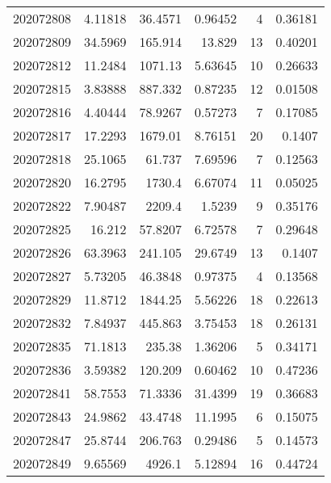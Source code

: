 \begin{tabular}{rrrrrr}
 202072808 &          4.11818 &       36.4571 &            0.96452 &           4 & 0.36181 \\
 202072809 &         34.5969  &      165.914  &           13.829   &          13 & 0.40201 \\
 202072812 &         11.2484  &     1071.13   &            5.63645 &          10 & 0.26633 \\
 202072815 &          3.83888 &      887.332  &            0.87235 &          12 & 0.01508 \\
 202072816 &          4.40444 &       78.9267 &            0.57273 &           7 & 0.17085 \\
 202072817 &         17.2293  &     1679.01   &            8.76151 &          20 & 0.1407  \\
 202072818 &         25.1065  &       61.737  &            7.69596 &           7 & 0.12563 \\
 202072820 &         16.2795  &     1730.4    &            6.67074 &          11 & 0.05025 \\
 202072822 &          7.90487 &     2209.4    &            1.5239  &           9 & 0.35176 \\
 202072825 &         16.212   &       57.8207 &            6.72578 &           7 & 0.29648 \\
 202072826 &         63.3963  &      241.105  &           29.6749  &          13 & 0.1407  \\
 202072827 &          5.73205 &       46.3848 &            0.97375 &           4 & 0.13568 \\
 202072829 &         11.8712  &     1844.25   &            5.56226 &          18 & 0.22613 \\
 202072832 &          7.84937 &      445.863  &            3.75453 &          18 & 0.26131 \\
 202072835 &         71.1813  &      235.38   &            1.36206 &           5 & 0.34171 \\
 202072836 &          3.59382 &      120.209  &            0.60462 &          10 & 0.47236 \\
 202072841 &         58.7553  &       71.3336 &           31.4399  &          19 & 0.36683 \\
 202072843 &         24.9862  &       43.4748 &           11.1995  &           6 & 0.15075 \\
 202072847 &         25.8744  &      206.763  &            0.29486 &           5 & 0.14573 \\
 202072849 &          9.65569 &     4926.1    &            5.12894 &          16 & 0.44724 \\

\end{tabular}
